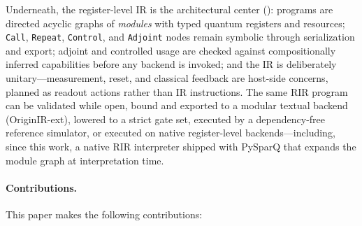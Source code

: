 Underneath, the register-level IR is the architectural center
(): programs are directed acyclic graphs of
\emph{modules} with typed quantum registers and resources; \texttt{Call},
\texttt{Repeat}, \texttt{Control}, and \texttt{Adjoint} nodes remain symbolic
through serialization and export; adjoint and controlled usage are checked
against compositionally inferred capabilities before any backend is invoked;
and the IR is deliberately unitary---measurement, reset, and classical
feedback are host-side concerns, planned as readout actions rather than IR
instructions.  The same RIR program can be validated while open, bound and
exported to a modular textual backend (OriginIR-ext), lowered to a strict
gate set, executed by a dependency-free reference simulator, or executed on
native register-level backends---including, since this work, a native RIR
interpreter shipped with PySparQ that expands the module graph at
interpretation time.

\paragraph{Contributions.}  This paper makes the following contributions:

